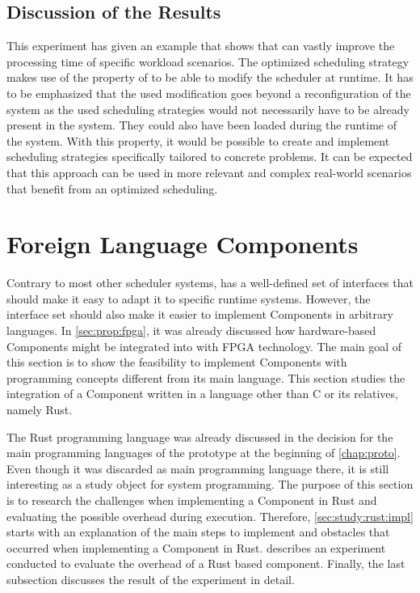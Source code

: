 \subsection{Discussion of the Results}

This experiment has given an example that shows that \cobas{} can vastly improve the processing time of specific workload scenarios. The optimized scheduling strategy makes use of the property of \cobas{} to be able to modify the scheduler at runtime. It has to be emphasized that the used modification goes beyond a reconfiguration of the system as the used scheduling strategies would not necessarily have to be already present in the system. They could also have been loaded during the runtime of the system. With this property, it would be possible to create and implement scheduling strategies specifically tailored to concrete problems. It can be expected that this approach can be used in more relevant and complex real-world scenarios that benefit from an optimized scheduling.

\section{Foreign Language Components}%
\label{sec:studies:language}

Contrary to most other scheduler systems, \cobas{} has a well-defined set of interfaces that should make it easy to adapt it to specific runtime systems. However, the interface set should also make it easier to implement Components in arbitrary languages. In \cref{sec:prop:fpga}, it was already discussed how hardware-based Components might be integrated into \cobas{} with \ac{FPGA} technology. The main goal of this section is to show the feasibility to implement \cobas{} Components with programming concepts different from its main language. This section studies the integration of a Component written in a language other than C or its relatives, namely Rust.

The Rust programming language was already discussed in the decision for the main programming languages of the \cobas{} prototype at the beginning of \cref{chap:proto}. Even though it was discarded as main programming language there, it is still interesting as a study object for system programming. The purpose of this section is to research the challenges when implementing a Component in Rust and evaluating the possible overhead during execution. Therefore, \cref{sec:study:rust:impl} starts with an explanation of the main steps to implement and obstacles that occurred when implementing a \cobas{} Component in Rust.  describes an experiment conducted to evaluate the overhead of a Rust based component. Finally, the last subsection discusses the result of the experiment in detail.

